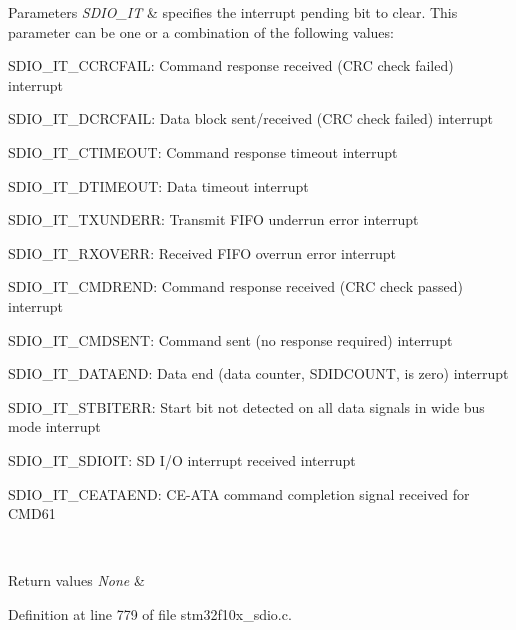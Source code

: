 \begin{DoxyParams}{Parameters}
{\em S\+D\+I\+O\+\_\+\+IT} & specifies the interrupt pending bit to clear. This parameter can be one or a combination of the following values\+: \begin{DoxyItemize}
\item S\+D\+I\+O\+\_\+\+I\+T\+\_\+\+C\+C\+R\+C\+F\+A\+IL\+: Command response received (C\+RC check failed) interrupt \item S\+D\+I\+O\+\_\+\+I\+T\+\_\+\+D\+C\+R\+C\+F\+A\+IL\+: Data block sent/received (C\+RC check failed) interrupt \item S\+D\+I\+O\+\_\+\+I\+T\+\_\+\+C\+T\+I\+M\+E\+O\+UT\+: Command response timeout interrupt \item S\+D\+I\+O\+\_\+\+I\+T\+\_\+\+D\+T\+I\+M\+E\+O\+UT\+: Data timeout interrupt \item S\+D\+I\+O\+\_\+\+I\+T\+\_\+\+T\+X\+U\+N\+D\+E\+RR\+: Transmit F\+I\+FO underrun error interrupt \item S\+D\+I\+O\+\_\+\+I\+T\+\_\+\+R\+X\+O\+V\+E\+RR\+: Received F\+I\+FO overrun error interrupt \item S\+D\+I\+O\+\_\+\+I\+T\+\_\+\+C\+M\+D\+R\+E\+ND\+: Command response received (C\+RC check passed) interrupt \item S\+D\+I\+O\+\_\+\+I\+T\+\_\+\+C\+M\+D\+S\+E\+NT\+: Command sent (no response required) interrupt \item S\+D\+I\+O\+\_\+\+I\+T\+\_\+\+D\+A\+T\+A\+E\+ND\+: Data end (data counter, S\+D\+I\+D\+C\+O\+U\+NT, is zero) interrupt \item S\+D\+I\+O\+\_\+\+I\+T\+\_\+\+S\+T\+B\+I\+T\+E\+RR\+: Start bit not detected on all data signals in wide bus mode interrupt \item S\+D\+I\+O\+\_\+\+I\+T\+\_\+\+S\+D\+I\+O\+IT\+: SD I/O interrupt received interrupt \item S\+D\+I\+O\+\_\+\+I\+T\+\_\+\+C\+E\+A\+T\+A\+E\+ND\+: C\+E-\/\+A\+TA command completion signal received for C\+M\+D61 \end{DoxyItemize}
\\
\hline
\end{DoxyParams}

\begin{DoxyRetVals}{Return values}
{\em None} & \\
\hline
\end{DoxyRetVals}


Definition at line 779 of file stm32f10x\+\_\+sdio.\+c.

\mbox{\label{group___s_d_i_o___private___functions_ga7243b857d6b323748ff3a493b265bedc}} 
